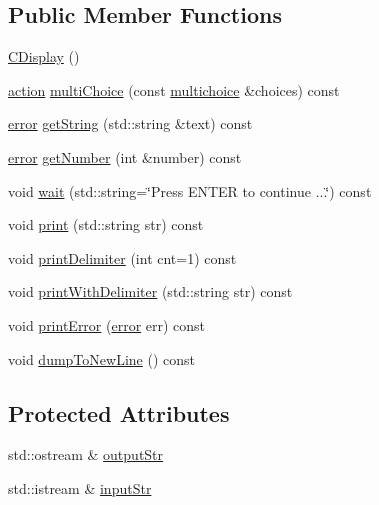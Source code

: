 \subsection*{Public Member Functions}
\begin{DoxyCompactItemize}
\item 
\mbox{\hyperlink{class_c_display_aeab4454cf16b08e1b091c495be595269}{C\+Display}} ()
\item 
\mbox{\hyperlink{_actions_list_8h_a2f4ab7bf743142dae2e459aa18f9f1d4}{action}} \mbox{\hyperlink{class_c_display_a7d4efb0285d6cdf757bc34e38718e17d}{multi\+Choice}} (const \mbox{\hyperlink{_game_menus_8h_acdb545ed67596d0840e35ed209fecbe9}{multichoice}} \&choices) const
\item 
\mbox{\hyperlink{_errors_list_8h_af10dacfa214e2575bb2e0ee407c242e0}{error}} \mbox{\hyperlink{class_c_display_a1bd3e25973ed15055a68d4db6abfa765}{get\+String}} (std\+::string \&text) const
\item 
\mbox{\hyperlink{_errors_list_8h_af10dacfa214e2575bb2e0ee407c242e0}{error}} \mbox{\hyperlink{class_c_display_af552459e3405bb18e1dd879f7fdc9606}{get\+Number}} (int \&number) const
\item 
void \mbox{\hyperlink{class_c_display_a3af2fc29db30feeabc68ffea6fb8c13a}{wait}} (std\+::string=\char`\"{}Press E\+N\+T\+ER to continue ...\char`\"{}) const
\item 
void \mbox{\hyperlink{class_c_display_a54c5d36f4bc11d4a935ff5c86ea4e653}{print}} (std\+::string str) const
\item 
void \mbox{\hyperlink{class_c_display_af350b35b44fc756e0c721ec4ee56c67a}{print\+Delimiter}} (int cnt=1) const
\item 
void \mbox{\hyperlink{class_c_display_a53b65673a9b0bfc807a3a1e448962928}{print\+With\+Delimiter}} (std\+::string str) const
\item 
void \mbox{\hyperlink{class_c_display_a63f3c4f78cef1d3b13290970da9e3e85}{print\+Error}} (\mbox{\hyperlink{_errors_list_8h_af10dacfa214e2575bb2e0ee407c242e0}{error}} err) const
\item 
void \mbox{\hyperlink{class_c_display_aba2a285f19e987f9ba82447f43be2b10}{dump\+To\+New\+Line}} () const
\end{DoxyCompactItemize}
\subsection*{Protected Attributes}
\begin{DoxyCompactItemize}
\item 
std\+::ostream \& \mbox{\hyperlink{class_c_display_ac275f884a9b9ff5e1cb3494128c7418a}{output\+Str}}
\item 
std\+::istream \& \mbox{\hyperlink{class_c_display_ac154ae55121a2f931942af9d6519466f}{input\+Str}}
\end{DoxyCompactItemize}


